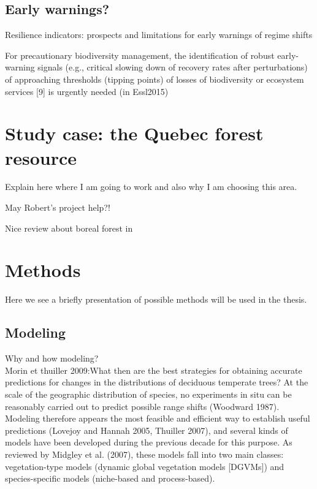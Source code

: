 \subsection{Early warnings?}

Resilience indicators: prospects and limitations for early warnings of regime shifts

For precautionary biodiversity management, the identification of robust early-warning signals (e.g., critical slowing down of recovery rates after perturbations) of approaching thresholds (tipping points) of losses of biodiversity or ecosystem services [9] is urgently needed (in Essl2015)

\section{Study case: the Quebec forest resource}

Explain here where I am going to work and also why I am choosing this area.

May Robert's project help?!

Nice review about boreal forest in \parencite{Price2013}

\section{Methods}
Here we see a briefly presentation of possible methods will be used in the thesis.

\subsection{Modeling}

Why and how modeling?\\
Morin et thuiller 2009:{What then are the best strategies for obtaining accurate predictions for changes in the distributions of deciduous temperate trees? At the scale of the geographic distribution of species, no experiments in situ can be reasonably carried out to predict possible range shifts (Woodward 1987). Modeling therefore appears the most feasible and efficient way to establish useful predictions (Lovejoy and Hannah 2005, Thuiller 2007), and several kinds of models have been developed during the previous decade for this purpose. As reviewed by Midgley et al. (2007), these models fall into two main classes: vegetation-type models (dynamic global vegetation models [DGVMs]) and species-specific models (niche-based and process-based).}

